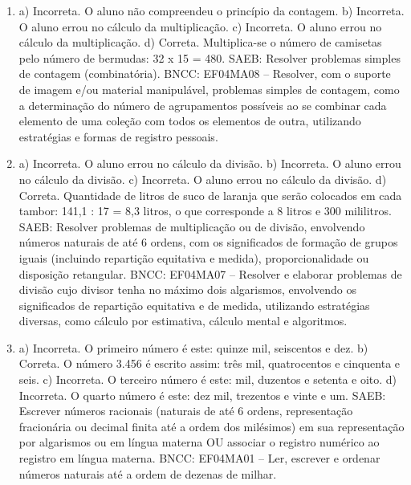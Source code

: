 \begin{enumerate}
\item
a) Incorreta. O aluno não compreendeu o princípio da contagem.
b) Incorreta. O aluno errou no cálculo da multiplicação.
c) Incorreta. O aluno errou no cálculo da multiplicação.
d) Correta. Multiplica-se o número de camisetas pelo número de bermudas: 32 x 15 = 480.
SAEB: Resolver problemas simples de contagem (combinatória).
BNCC: EF04MA08 -- Resolver, com o suporte de imagem e/ou material manipulável, problemas simples
de contagem, como a determinação do número de agrupamentos possíveis ao se combinar cada
elemento de uma coleção com todos os elementos de outra, utilizando estratégias e formas de
registro pessoais.

\item
a) Incorreta. O aluno errou no cálculo da divisão.
b) Incorreta. O aluno errou no cálculo da divisão.
c) Incorreta. O aluno errou no cálculo da divisão.
d) Correta. Quantidade de litros de suco de laranja que serão colocados em cada
tambor: 141,1 : 17 = 8,3 litros, o que corresponde a 8 litros e 300 mililitros.
SAEB: Resolver problemas de multiplicação ou de divisão,
envolvendo números naturais de até 6 ordens, com os significados de
formação de grupos iguais (incluindo repartição equitativa e medida),
proporcionalidade ou disposição retangular.
BNCC: EF04MA07 -- Resolver e elaborar problemas de divisão cujo divisor tenha no máximo dois algarismos,
envolvendo os significados de repartição equitativa e de medida, utilizando estratégias diversas,
como cálculo por estimativa, cálculo mental e algoritmos.

\item
a) Incorreta. O primeiro número é este: quinze mil, seiscentos e dez.
b) Correta. O número 3.456 é escrito assim: três mil, quatrocentos e cinquenta e seis.
c) Incorreta. O terceiro número é este: mil, duzentos e setenta e oito.
d) Incorreta. O quarto número é este: dez mil, trezentos e vinte e um.
SAEB: Escrever números racionais (naturais de até 6 ordens, representação
fracionária ou decimal finita até a ordem dos milésimos) em sua
representação por algarismos ou em língua materna OU associar o registro
numérico ao registro em língua materna.
BNCC: EF04MA01 -- Ler, escrever e ordenar números naturais até a ordem de dezenas de milhar.
\end{enumerate}



